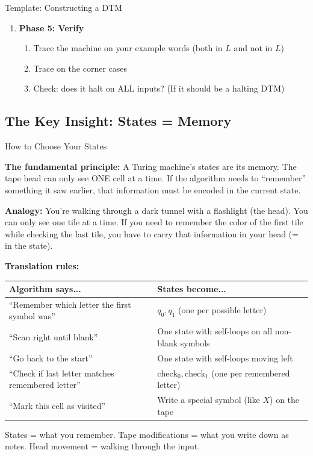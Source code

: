 \documentclass[11pt,a4paper]{article}
\newcommand{\keytakeaway}[1]{%
  \par\vspace{0.3em}%
  \colorbox{yellow!60}{\parbox{\dimexpr\linewidth-2\fboxsep}{#1}}%
  \vspace{0.3em}}
\begin{document}
\begin{templatebox}{Template: Constructing a DTM}
\begin{enumerate}
    \item \textbf{Phase 5: Verify}
    \begin{enumerate}[label=(\alph*)]
        \item Trace the machine on your example words (both in $L$ and not in $L$)
        \item Trace on the corner cases
        \item Check: does it halt on ALL inputs? (If it should be a halting DTM)
    \end{enumerate}
\end{enumerate}
\end{templatebox}

\subsection{The Key Insight: States = Memory}

\begin{conceptbox}{How to Choose Your States}

\textbf{The fundamental principle:} A Turing machine's states are its memory. The tape head can only see ONE cell at a time. If the algorithm needs to ``remember'' something it saw earlier, that information must be encoded in the current state.

\textbf{Analogy:} You're walking through a dark tunnel with a flashlight (the head). You can only see one tile at a time. If you need to remember the color of the first tile while checking the last tile, you have to carry that information in your head (= in the state).

\textbf{Translation rules:}
\begin{center}
\renewcommand{\arraystretch}{1.3}
\begin{tabular}{l|l}
\toprule
\textbf{Algorithm says...} & \textbf{States become...} \\
\midrule
``Remember which letter the first symbol was'' & $q_0, q_1$ (one per possible letter) \\
``Scan right until blank'' & One state with self-loops on all non-blank symbols \\
``Go back to the start'' & One state with self-loops moving left \\
``Check if last letter matches remembered letter'' & $\text{check}_0, \text{check}_1$ (one per remembered letter) \\
``Mark this cell as visited'' & Write a special symbol (like $X$) on the tape \\
\bottomrule
\end{tabular}
\end{center}

\keytakeaway{States = what you remember. Tape modifications = what you write down as notes. Head movement = walking through the input.}
\end{conceptbox}
\end{document}
